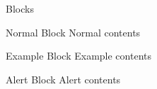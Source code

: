 \begin{frame}{Blocks}
  \begin{block}{Normal Block}
    Normal contents
  \end{block}

  \begin{exampleblock}{Example Block}
    Example contents
  \end{exampleblock}

  \begin{alertblock}{Alert Block}
    Alert contents
  \end{alertblock}
\end{frame}
